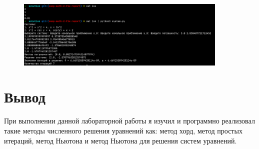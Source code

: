 \begin{figure}[H]
	\centering
	\includegraphics[width=0.9\textwidth]{./img/test4.png}
\end{figure}


\section{Вывод}
При выполнении данной лабораторной работы я изучил и программно реализовал такие методы
численного решения уравнений как: метод хорд, метод простых итераций, метод Ньютона и
метод Ньютона для решения систем уравнений.
